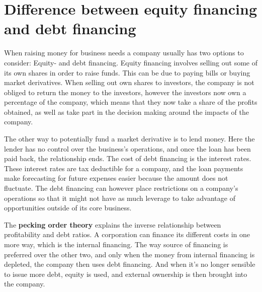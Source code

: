 \documentclass[10pt,a4paper]{article}
\begin{document}
    \section{Difference between equity financing and debt financing}
        When raising money for business needs a company usually has two options to consider: Equity- and debt financing. Equity financing involves selling out some of its own shares in order to raise funds. This can be due to paying bills or buying market derivatives. When selling out own shares to investors, the company is not obliged to return the money to the investors, however the investors now own a percentage of the company, which means that they now take a share of the profits obtained, as well as take part in the decision making around the impacts of the company.

        The other way to potentially fund a market derivative is to lend money. Here the lender has no control over the business's operations, and once the loan has been paid back, the relationship ends. The cost of debt financing is the interest rates. These interest rates are tax deductible for a company, and the loan payments make forecasting for future expenses easier because the amount does not fluctuate. The debt financing can however place restrictions on a company's operations so that it might not have as much leverage to take advantage of opportunities outside of its core business.
        
        The \textbf{pecking order theory} explains the inverse relationship between profitability and debt ratios. A corporation can finance its different costs in one more way, which is the internal financing. The way source of financing is preferred over the other two, and only when the money from internal financing is depleted, the company then uses debt financing. And when it's no longer sensible to issue more debt, equity is used, and external ownership is then brought into the company. 
\end{document}
